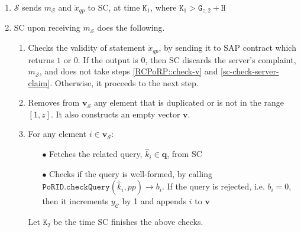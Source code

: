 \begin{enumerate}
\begin{enumerate}
\item $\mathcal S$  sends ${m}_{\scriptscriptstyle\mathcal S}$ and $\ddot{x}_{\scriptscriptstyle qp}$ to SC, at time $\texttt{K}_{\scriptscriptstyle 1}$, where $\texttt{K}_{\scriptscriptstyle 1}>\texttt{G}_{\scriptscriptstyle z,2} + \texttt{H}$

\item SC upon receiving ${m}_{\scriptscriptstyle\mathcal S}$ does the following. 
\begin{enumerate}



\item Checks the validity of  statement $\ddot{x}_{\scriptscriptstyle qp}$, by  sending it to SAP contract which  returns   $1$ or $0$. If the output is $0$, then SC discards the server's complaint, $m_{\scriptscriptstyle\mathcal S}$, and does not take steps \ref{RCPoRP::check-v} and \ref{sc-check-server-claim}. Otherwise, it proceeds to the next step.


\item\label{RCPoRP::check-v} Removes from $ {\bm{v}}_{\scriptscriptstyle\mathcal{S}}$ any element that is duplicated or is not in the range $[1,z]$. It also constructs an empty vector $ {\bm{v}}$.

\item\label{sc-check-server-claim}  For any element $i\in {\bm{v}}_{\scriptscriptstyle\mathcal{S}}$:
\begin{itemize}
\item[$\bullet$] Fetches the related query, $\hat{k}_{\scriptscriptstyle i}\in \bm{q}$,   from SC 
\item[$\bullet$]Checks if  the query is well-formed, by calling $\mathtt{PoRID.checkQuery}(\hat{k}_{\scriptscriptstyle i}, pp)\rightarrow b_{\scriptscriptstyle i}$. If the query is rejected, i.e. $ b_{\scriptscriptstyle i}=0$, then it increments $y_{\scriptscriptstyle\mathcal C}$ by 1 and appends $i$ to $ {\bm{v}}$
\end{itemize}
Let $\texttt{K}_{\scriptscriptstyle 2}$ be the time SC finishes the above checks.
\end{enumerate}






\end{enumerate}
\end{enumerate}
